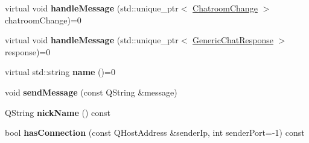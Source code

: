 \begin{DoxyCompactItemize}
\item 
\hypertarget{classSimpleChat_1_1Client_a235dfb2fb833d30ae89b45d137e2b213}{virtual void {\bfseries handle\-Message} (std\-::unique\-\_\-ptr$<$ \hyperlink{classSimpleChat_1_1ChatroomChange}{Chatroom\-Change} $>$ chatroom\-Change)=0}\label{classSimpleChat_1_1Client_a235dfb2fb833d30ae89b45d137e2b213}

\item 
\hypertarget{classSimpleChat_1_1Client_abb550a7e0ca6b2cd238ac260280554f6}{virtual void {\bfseries handle\-Message} (std\-::unique\-\_\-ptr$<$ \hyperlink{classSimpleChat_1_1GenericChatResponse}{Generic\-Chat\-Response} $>$ response)=0}\label{classSimpleChat_1_1Client_abb550a7e0ca6b2cd238ac260280554f6}

\item 
\hypertarget{classSimpleChat_1_1Client_ae43df7f8403aa1f21ef11e3ded5f808f}{virtual std\-::string {\bfseries name} ()=0}\label{classSimpleChat_1_1Client_ae43df7f8403aa1f21ef11e3ded5f808f}

\item 
\hypertarget{classSimpleChat_1_1Client_a288256d4752a558bbaeb5923b5764f31}{void {\bfseries send\-Message} (const Q\-String \&message)}\label{classSimpleChat_1_1Client_a288256d4752a558bbaeb5923b5764f31}

\item 
\hypertarget{classSimpleChat_1_1Client_a9c42ea3b937cd82970e45ab8f54e3f4a}{Q\-String {\bfseries nick\-Name} () const }\label{classSimpleChat_1_1Client_a9c42ea3b937cd82970e45ab8f54e3f4a}

\item 
\hypertarget{classSimpleChat_1_1Client_a11d8ef0ed9f8b3faf08f300452d334fd}{bool {\bfseries has\-Connection} (const Q\-Host\-Address \&sender\-Ip, int sender\-Port=-\/1) const }\label{classSimpleChat_1_1Client_a11d8ef0ed9f8b3faf08f300452d334fd}

\end{DoxyCompactItemize}
